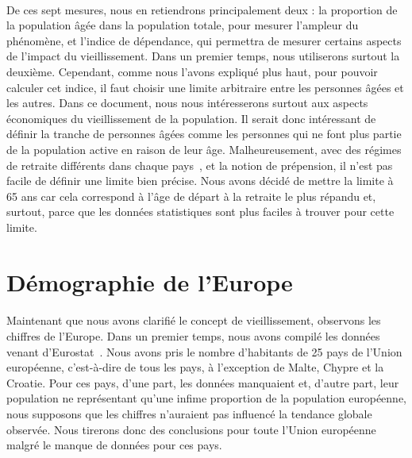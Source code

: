 \paragraph{} De ces sept mesures, nous en retiendrons principalement deux : la proportion de la population âgée dans la population totale, pour mesurer l’ampleur du phénomène, et l’indice de dépendance, qui permettra de mesurer certains aspects de l’impact du vieillissement. Dans un premier temps, nous utiliserons surtout la deuxième. Cependant, comme nous l’avons expliqué plus haut, pour pouvoir calculer cet indice, il faut choisir une limite arbitraire entre les personnes âgées et les autres. Dans ce document, nous nous intéresserons surtout aux aspects économiques du vieillissement de la population. Il serait donc intéressant de définir la tranche de personnes âgées comme les personnes qui ne font plus partie de la population active en raison de leur âge. Malheureusement, avec des régimes de retraite différents dans chaque pays~\citep{age_retraite}, et la notion de prépension, il n’est pas facile de définir une limite bien précise. Nous avons décidé de mettre la limite à 65 ans car cela correspond à l’âge de départ à la retraite le plus répandu et, surtout, parce que les données statistiques sont plus faciles à trouver pour cette limite. 

\section{Démographie de l'Europe}
\paragraph{}Maintenant que nous avons clarifié le concept de vieillissement, observons les chiffres de l’Europe. Dans un premier temps, nous avons compilé les données venant d'Eurostat~\citep{eurostat_pop}. Nous avons pris le nombre d’habitants de 25 pays de l’Union européenne, c’est-à-dire de tous les pays, à l’exception de Malte, Chypre et la Croatie. Pour ces pays, d'une part, les données manquaient et, d'autre part, leur population ne représentant qu'une infime proportion de la population européenne, nous supposons que les chiffres n’auraient pas influencé la tendance globale observée. Nous tirerons donc des conclusions pour toute l’Union européenne malgré le manque de données pour ces pays.

